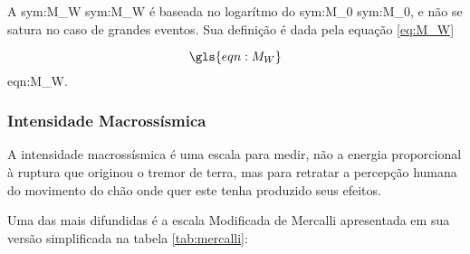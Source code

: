 A \glsdesc{sym:M_W} \gls{sym:M_W} \citep{hanks_1999} é baseada no 
logarítmo do \glsdesc{sym:M_0} \gls{sym:M_0}, e não se satura no caso de grandes eventos. 
Sua definição é dada pela equação \ref{eq:M_W} 

\begin{equation}
	\gls{eqn:M_W}
	\label{eq:M_W}
\end{equation}
\glsdesc*{eqn:M_W}.


\subsubsection{Intensidade Macrossísmica}
\label{sec:risco_sismico}


A intensidade macrossísmica é uma escala para medir, não a energia proporcional
à ruptura que originou o tremor de terra, mas para retratar a percepção humana do
movimento do chão onde quer este tenha produzido seus efeitos.

Uma das mais difundidas é a escala Modificada de Mercalli \citep{richter_1958} apresentada em sua versão simplificada 
na tabela \ref{tab:mercalli}:

